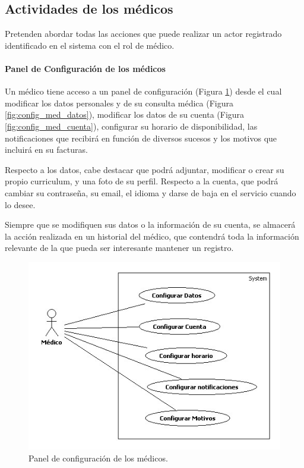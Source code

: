 \documentclass[a4paper,oneside,11pt]{book}
\begin{document}
	
	
		\subsection{Actividades de los médicos} %
		\label{sec:actividades_de_los_medicos}
		
			Pretenden abordar todas las acciones que puede realizar un actor registrado identificado en el sistema con el rol de médico.
			\paragraph{Panel de Configuración de los médicos} %
			\label{par:panel_de_configuracion_de_los_medicos}
				Un médico tiene acceso a un panel de configuración (Figura \ref{fig:config_med}) desde el cual modificar los datos personales y de su consulta médica (Figura \ref{fig:config_med_datos}), modificar los datos de su cuenta (Figura \ref{fig:config_med_cuenta}), configurar su horario de disponibilidad, las notificaciones que recibirá en función de diversos sucesos y los motivos que incluirá en su facturas.
				
				Respecto a los datos, cabe destacar que podrá adjuntar, modificar o crear su propio curriculum, y una foto de su perfil. Respecto a la cuenta, que podrá cambiar su contraseña, su email, el idioma y darse de baja en el servicio cuando lo desee.
				
				Siempre que se modifiquen sus datos o la información de su cuenta, se almacerá la acción realizada en un historial del médico, que contendrá toda la información relevante de la que pueda ser interesante mantener un registro.
				\begin{figure}[H]
				  \centering
				    \includegraphics[width=12cm]{img/jpg/casos_uso/Configuracion_Medico.jpg}
				  \caption{Panel de configuración de los médicos.}
				  \label{fig:config_med}
				\end{figure}
				
\end{document}
